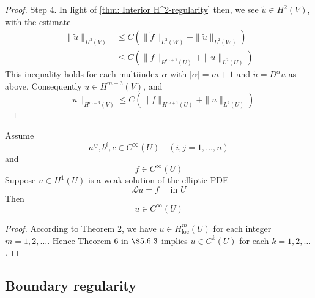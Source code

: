 \begin{theorem}
\begin{proof}
        Step 4.
        In light of \ref{thm: Interior H^2-regularity} then, we see $\tilde{u} \in H^2(V)$, with the estimate
        \begin{equation*}
            \begin{aligned}
                \|\tilde{u}\|_{H^2(V)} & \leq C\left(\|\tilde{f}\|_{L^2(W)}+\|\tilde{u}\|_{L^2(W)}\right) \\
                                       & \leq C\left(\|f\|_{H^{m+1}(U)}+\|u\|_{L^2(U)}\right)
            \end{aligned}
        \end{equation*}
        This inequality holds for each multiindex $\alpha$ with $|\alpha|=m+1$ and $\tilde{u}=D^\alpha u$ as above. Consequently $u \in H^{m+3}(V)$, and
        \begin{equation*}
            \|u\|_{H^{m+3}(V)} \leq C\left(\|f\|_{H^{m+1}(U)}+\|u\|_{L^2(U)}\right)
        \end{equation*}
    \end{proof}
\end{theorem}





\begin{corollary}
    Assume
    \begin{equation*}
        a^{i j}, b^i, c \in C^{\infty}(U) \quad(i, j=1, \ldots, n)
    \end{equation*}
    and
    \begin{equation*}
        f \in C^{\infty}(U)
    \end{equation*}
    Suppose $u \in H^1(U)$ is a weak solution of the elliptic PDE
    \begin{equation*}
        \mathcal{L}u=f \quad \text { in } U
    \end{equation*}
    Then
    \begin{equation*}
        u \in C^{\infty}(U)
    \end{equation*}

    \begin{proof}
        According to Theorem 2, we have $u \in H_{\mathrm{loc}}^m(U)$ for each integer $m=1,2, \ldots$. Hence Theorem 6 in $\S 5.6 .3$ implies $u \in C^k(U)$ for each $k=1,2, \ldots$.
    \end{proof}
\end{corollary}

\subsection{Boundary regularity} %

